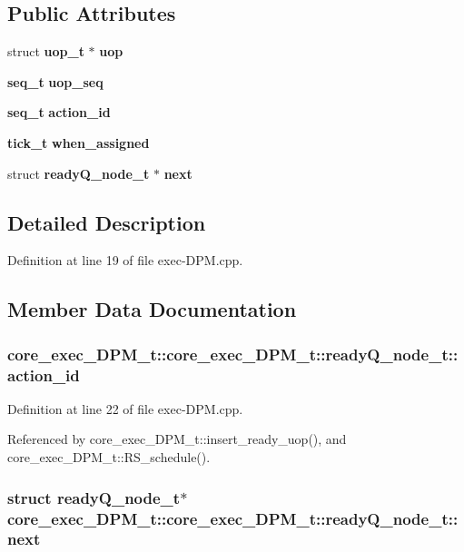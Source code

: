 \subsection*{Public Attributes}
\begin{CompactItemize}
\item 
struct {\bf uop\_\-t} $\ast$ {\bf uop}
\item 
{\bf seq\_\-t} {\bf uop\_\-seq}
\item 
{\bf seq\_\-t} {\bf action\_\-id}
\item 
{\bf tick\_\-t} {\bf when\_\-assigned}
\item 
struct {\bf readyQ\_\-node\_\-t} $\ast$ {\bf next}
\end{CompactItemize}


\subsection{Detailed Description}


Definition at line 19 of file exec-DPM.cpp.

\subsection{Member Data Documentation}
\subsubsection[{action\_\-id}]{ core\_\-exec\_\-DPM\_\-t::core\_\-exec\_\-DPM\_\-t::readyQ\_\-node\_\-t::action\_\-id}\label{structcore__exec__DPM__t_1_1readyQ__node__t_5538521f28949dfa480704b9ef236be5}




Definition at line 22 of file exec-DPM.cpp.

Referenced by core\_\-exec\_\-DPM\_\-t::insert\_\-ready\_\-uop(), and core\_\-exec\_\-DPM\_\-t::RS\_\-schedule().
\subsubsection[{next}]{\setlength{\rightskip}{0pt plus 5cm}struct {\bf readyQ\_\-node\_\-t}$\ast$ core\_\-exec\_\-DPM\_\-t::core\_\-exec\_\-DPM\_\-t::readyQ\_\-node\_\-t::next\hspace{0.3cm}{\tt  [read]}}\label{structcore__exec__DPM__t_1_1readyQ__node__t_e6f3f80b57654bd5643e29db316f745c}




